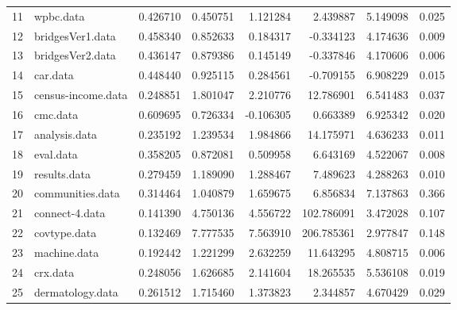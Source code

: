 \begin{table}
{\begin{tabular}{llrrrrrr}
11 &                                wpbc.data &       0.426710 &               0.450751 &   1.121284 &    2.439887 &  5.149098 &        0.025 \\
12 &                         bridgesVer1.data &       0.458340 &               0.852633 &   0.184317 &   -0.334123 &  4.174636 &        0.009 \\
13 &                         bridgesVer2.data &       0.436147 &               0.879386 &   0.145149 &   -0.337846 &  4.170606 &        0.006 \\
14 &                                 car.data &       0.448440 &               0.925115 &   0.284561 &   -0.709155 &  6.908229 &        0.015 \\
15 &                       census-income.data &       0.248851 &               1.801047 &   2.210776 &   12.786901 &  6.541483 &        0.037 \\
16 &                                 cmc.data &       0.609695 &               0.726334 &  -0.106305 &    0.663389 &  6.925342 &        0.020 \\
17 &                            analysis.data &       0.235192 &               1.239534 &   1.984866 &   14.175971 &  4.636233 &        0.011 \\
18 &                                eval.data &       0.358205 &               0.872081 &   0.509958 &    6.643169 &  4.522067 &        0.008 \\
19 &                             results.data &       0.279459 &               1.189090 &   1.288467 &    7.489623 &  4.288263 &        0.010 \\
20 &                         communities.data &       0.314464 &               1.040879 &   1.659675 &    6.856834 &  7.137863 &        0.366 \\
21 &                           connect-4.data &       0.141390 &               4.750136 &   4.556722 &  102.786091 &  3.472028 &        0.107 \\
22 &                             covtype.data &       0.132469 &               7.777535 &   7.563910 &  206.785361 &  2.977847 &        0.148 \\
23 &                             machine.data &       0.192442 &               1.221299 &   2.632259 &   11.643295 &  4.808715 &        0.006 \\
24 &                                 crx.data &       0.248056 &               1.626685 &   2.141604 &   18.265535 &  5.536108 &        0.019 \\
25 &                         dermatology.data &       0.261512 &               1.715460 &   1.373823 &    2.344857 &  4.670429 &        0.029 \\

\end{tabular}}
\end{table}
